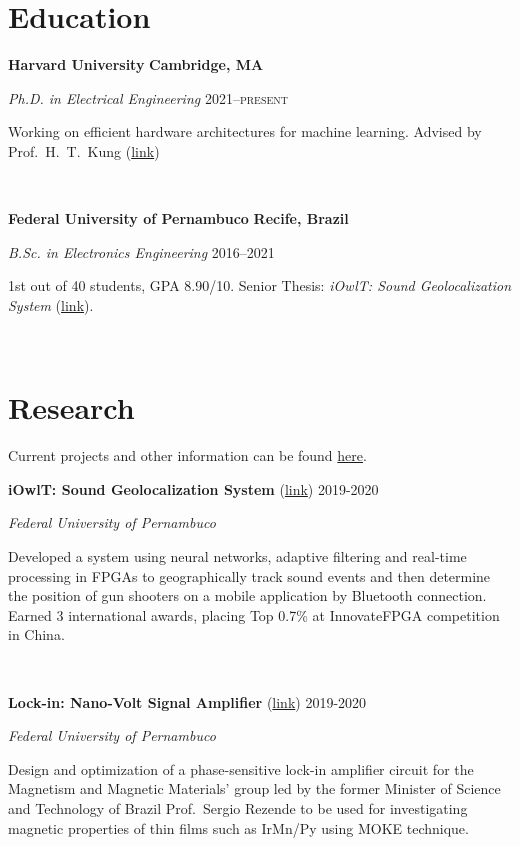 \documentclass[letterpaper,10pt]{article}
\newcommand{\entry}[4]{

\begin{minipage}[t]{.15\textwidth}
\end{minipage}
\hfill\vline\hfill 
\begin{minipage}[t]{0.95\textwidth}
#2 \hfill \textsc{#1}

\textit{#3}

\footnotesize{#4}
\end{minipage}\\\vspace{.25cm}}
\newcommand{\we}[5]{

\begin{minipage}[t]{.15\textwidth}
\end{minipage}
\hfill\vline\hfill 
\begin{minipage}[t]{0.95\textwidth}
#2 \hfill \textbf{#5}

\textit{#3} \hfill \textsc{#1}

\footnotesize{#4}
\end{minipage}\\\vspace{.25cm}}
\newcommand{\harv}{Harvard University}
\newcommand{\ufpe}{Federal University of Pernambuco}
\begin{document}

\par{\par}
\par{\par}

\vspace{.25cm}

\section{Education}

\we{2021--present}{\textbf{\harv}}{Ph.D. in Electrical Engineering}{Working on efficient hardware architectures for machine learning. Advised by Prof.\ H.\ T.\ Kung (\href{https://www.eecs.harvard.edu/htk/}{link})}{Cambridge, MA}
\we{2016--2021}{\textbf{\ufpe}}{B.Sc. in Electronics Engineering}{
	1st out of 40 students, GPA 8.90/10. Senior Thesis: \textit{iOwlT: Sound Geolocalization System} (\href{https://www.cin.ufpe.br/~msf4/assets/files/SeniorThesis.pdf}{link}).
	}{Recife, Brazil}

\section{Research}

Current projects and other information can be found \href{https://www.cin.ufpe.br/~msf4/}{here}.

\vspace{.25cm}

\entry{2019-2020}{\textbf{iOwlT: Sound Geolocalization System} (\href{https://www.cin.ufpe.br/~msf4/iowlt.html}{link})}{\ufpe}{
	Developed a system using neural networks, adaptive filtering and real-time processing in FPGAs to geographically track sound events and then determine the position of gun shooters on a mobile application by Bluetooth connection. Earned 3 international awards, placing Top 0.7\% at InnovateFPGA competition in China.
	}

\entry{2019-2020}{\textbf{Lock-in: Nano-Volt Signal Amplifier} (\href{https://www.cin.ufpe.br/~msf4/lockin.html}{link})}{\ufpe}{
	Design and optimization of a phase-sensitive lock-in amplifier circuit for the Magnetism and Magnetic Materials' group led by the former Minister of Science and Technology of Brazil Prof.\ Sergio Rezende to be used for investigating magnetic properties of thin films such as IrMn/Py using MOKE technique.
}
\end{document}
